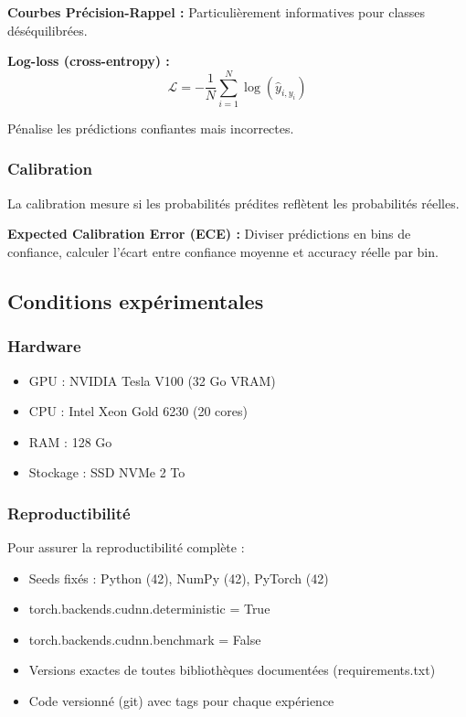 \textbf{Courbes Précision-Rappel :}
Particulièrement informatives pour classes déséquilibrées.

\textbf{Log-loss (cross-entropy) :}
\[
\mathcal{L} = -\frac{1}{N}\sum_{i=1}^N \log(\hat{y}_{i, y_i})
\]

Pénalise les prédictions confiantes mais incorrectes.

\subsubsection{Calibration}

La calibration mesure si les probabilités prédites reflètent les probabilités réelles.

\textbf{Expected Calibration Error (ECE) :}
Diviser prédictions en bins de confiance, calculer l'écart entre confiance moyenne et accuracy réelle par bin.

\subsection{Conditions expérimentales}

\subsubsection{Hardware}

\begin{itemize}
    \item GPU : NVIDIA Tesla V100 (32 Go VRAM)
    \item CPU : Intel Xeon Gold 6230 (20 cores)
    \item RAM : 128 Go
    \item Stockage : SSD NVMe 2 To
\end{itemize}

\subsubsection{Reproductibilité}

Pour assurer la reproductibilité complète :
\begin{itemize}
    \item Seeds fixés : Python (42), NumPy (42), PyTorch (42)
    \item torch.backends.cudnn.deterministic = True
    \item torch.backends.cudnn.benchmark = False
    \item Versions exactes de toutes bibliothèques documentées (requirements.txt)
    \item Code versionné (git) avec tags pour chaque expérience
\end{itemize}

